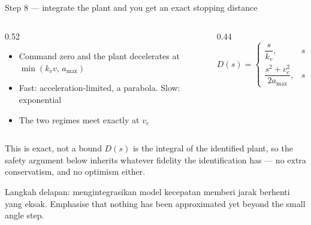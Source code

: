 \documentclass[aspectratio=169,11pt,t]{beamer}
\begin{document}
\begin{frame}{Step 8 --- integrate the plant and you get an exact stopping distance}
  \begin{columns}[T,onlytextwidth]
    \begin{column}{0.52\textwidth}
      \begin{itemize}\bulletgap\small
        \item Command zero and the plant decelerates at
              $\min(k_v v,\,a_{\max})$
        \item Fast: acceleration-limited, a parabola. Slow: exponential
        \item The two regimes meet exactly at $v_c$
      \end{itemize}
    \end{column}
    \begin{column}{0.44\textwidth}
      \vskip1mm {\small
      \[ D(s)=\begin{cases}
           \dfrac{s}{k_v}, & s\le v_c\\[2.2ex]
           \dfrac{s^2+v_c^2}{2a_{\max}}, & s>v_c
         \end{cases} \]}
    \end{column}
  \end{columns}
  \vfill
  \begin{callout}{This is exact, not a bound}
    $D(s)$ is the integral of the identified plant, so the safety argument below
    inherits whatever fidelity the identification has --- no extra conservatism,
    and no optimism either.
  \end{callout}
    {Langkah delapan: mengintegrasikan model kecepatan memberi jarak berhenti yang eksak.}
    {Emphasise that nothing has been approximated yet beyond the small
        angle step.}
\end{frame}
\end{document}
